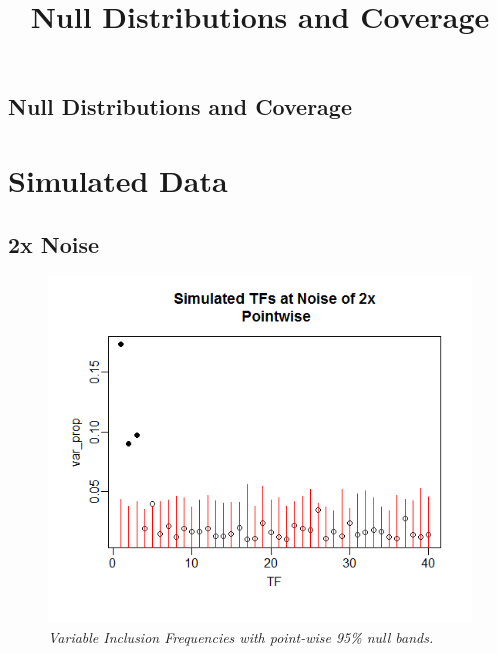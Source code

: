 \documentclass[12pt]{article}
\title{Null Distributions and Coverage}
\date{}
\begin{document}
\begin{center}\section*{Null Distributions and Coverage}\end{center}
\section{Simulated Data}
\subsection*{2x Noise}
\begin{figure}[H]
\centerline{\includegraphics[scale=.5]{noise2p}}
\caption{\it Variable Inclusion Frequencies with point-wise 95\% null bands.}\label{fig:f1}  
\end{figure}
\end{document}
